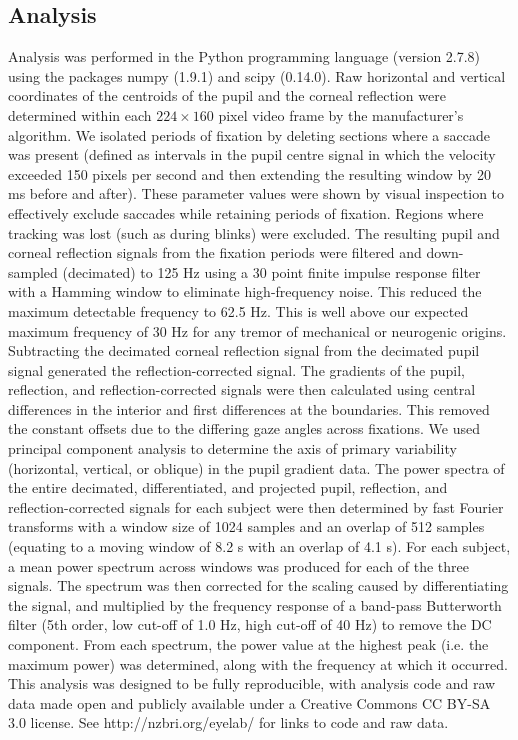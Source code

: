 \documentclass[jou,a4paper]{apa6}
\begin{document}
\subsection{Analysis}
Analysis was performed in the Python programming language (version 2.7.8) using the packages numpy (1.9.1) and scipy (0.14.0). Raw horizontal and vertical coordinates of the centroids of the pupil and the corneal reflection were determined within each $224 \times 160$ pixel video frame by the manufacturer's algorithm. We isolated periods of fixation by deleting sections where a saccade was present (defined as intervals in the pupil centre signal in which the velocity exceeded 150 pixels per second and then extending the resulting window by 20 ms before and after). These parameter values were shown by visual inspection to effectively exclude saccades while retaining periods of fixation. Regions where tracking was lost (such as during blinks) were excluded.
The resulting pupil and corneal reflection signals from the fixation periods were filtered and down-sampled (decimated) to 125 Hz using a 30 point finite impulse response filter with a Hamming window to eliminate high-frequency noise. This reduced the maximum detectable frequency to 62.5 Hz. This is well above our expected maximum frequency of 30 Hz for any tremor of mechanical or neurogenic origins. 
Subtracting the decimated corneal reflection signal from the decimated pupil signal generated the reflection-corrected signal. The gradients of the pupil, reflection, and reflection-corrected signals were then calculated using central differences in the interior and first differences at the boundaries. This removed the constant offsets due to the differing gaze angles across fixations. We used principal component analysis to determine the axis of primary variability (horizontal, vertical, or oblique) in the pupil gradient data.
The power spectra of the entire decimated, differentiated, and projected pupil, reflection, and reflection-corrected signals for each subject were then determined by fast Fourier transforms with a window size of 1024 samples and an overlap of 512 samples (equating to a moving window of 8.2 s with an overlap of 4.1 s). For each subject, a mean power spectrum across windows was produced for each of the three signals. The spectrum was then corrected for the scaling caused by differentiating the signal, and multiplied by the frequency response of a band-pass Butterworth filter (5th order, low cut-off of 1.0 Hz, high cut-off of 40 Hz) to remove the DC component. From each spectrum, the power value at the highest peak (i.e. the maximum power) was determined, along with the frequency at which it occurred.
This analysis was designed to be fully reproducible, with analysis code and raw data made open and publicly available under a Creative Commons CC BY-SA 3.0 license. See http://nzbri.org/eyelab/ for links to code and raw data.
\end{document}
